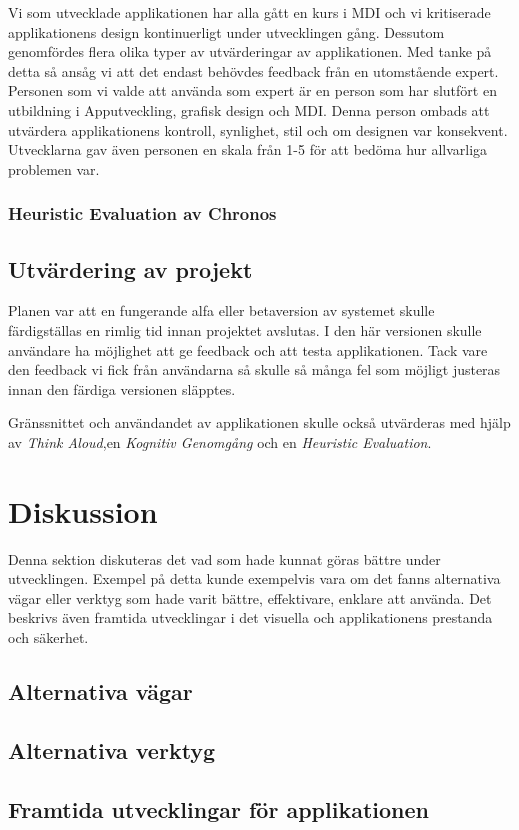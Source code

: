 \documentclass[a4paper, 11pt]{article}
\begin{document}
Vi som utvecklade applikationen har alla gått en kurs i MDI och vi kritiserade applikationens design kontinuerligt under utvecklingen gång. Dessutom genomfördes flera olika typer av utvärderingar av applikationen. Med tanke på detta så ansåg vi att det endast behövdes feedback från en utomstående expert. Personen som vi valde att använda som expert är en person som har slutfört en utbildning i Apputveckling, grafisk design och MDI. 
Denna person ombads att utvärdera applikationens kontroll, synlighet, stil och om designen var konsekvent. Utvecklarna gav även personen en skala från 1-5 för att bedöma hur allvarliga problemen var.  

\subsubsection{Heuristic Evaluation av Chronos}


\subsection{Utvärdering av projekt}
Planen var att en fungerande alfa eller betaversion av systemet skulle färdigställas en rimlig tid innan projektet avslutas. I den här versionen skulle användare ha möjlighet att ge feedback och att testa applikationen. Tack vare den feedback vi fick från användarna så skulle så många fel som möjligt justeras innan den färdiga versionen släpptes.

Gränssnittet och användandet av applikationen skulle också utvärderas med hjälp av \textit{Think Aloud},en \textit{Kognitiv Genomgång} och en \textit{Heuristic Evaluation}.

\section{Diskussion}
Denna sektion diskuteras det vad som hade kunnat göras bättre under utvecklingen. Exempel på detta kunde exempelvis vara om det fanns alternativa vägar eller verktyg som hade varit bättre, effektivare, enklare att använda. Det beskrivs även framtida utvecklingar i det visuella och applikationens prestanda och säkerhet.

\subsection{Alternativa vägar}

\subsection{Alternativa verktyg}

\subsection{Framtida utvecklingar för applikationen}



\newpage
\printbibliography[title={Referenser}]
\end{document}
